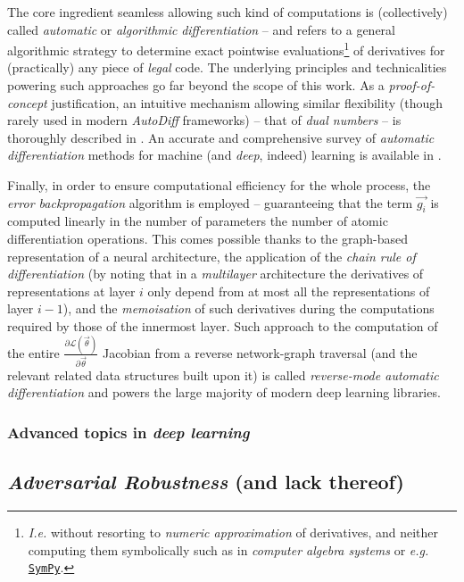 The core ingredient seamless allowing such kind of computations is (collectively) called \textit{automatic} or \textit{algorithmic} \textit{differentiation} -- and refers to a general algorithmic strategy to determine exact pointwise evaluations\footnote{\textit{I.e.} without resorting to \textit{numeric approximation} of derivatives, and neither computing them symbolically such as in \textit{computer algebra systems} or \textit{e.g.} \href{https://www.sympy.org/}{\texttt{SymPy}}.} of derivatives for (practically) any piece of \textit{legal} code. The underlying principles and technicalities powering such approaches go far beyond the scope of this work. As a \textit{proof-of-concept} justification, an intuitive mechanism allowing similar flexibility (though rarely used in modern \textit{AutoDiff} frameworks) -- that of \textit{dual numbers} -- is thoroughly described in \cite{Fischer1998DualNumbers}. An accurate and comprehensive survey of \textit{automatic differentiation} methods for machine (and \textit{deep}, indeed) learning is available in \cite{BaydinEtAl2018AutoDiff}.

Finally, in order to ensure computational efficiency for the whole process, the \textit{error backpropagation} algorithm is employed -- guaranteeing that the term $\vec{g_i}$ is computed linearly in the number of parameters \wrt the number of atomic differentiation operations. This comes possible thanks to the graph-based representation of a neural architecture, the application of the \textit{chain rule of differentiation} (by noting that in a \textit{multilayer} architecture the derivatives of representations at layer $i$ only depend from at most all the representations of layer $i-1$), and the \textit{memoisation} of such derivatives during the computations required by those of the innermost layer. Such approach to the computation of the entire $\frac{\partial\mathcal{L}(\vec{\theta})}{\partial\vec{\theta}}$ Jacobian from a reverse network-graph traversal (and the relevant related data structures built upon it) is called \textit{reverse-mode automatic differentiation} and powers the large majority of modern deep learning libraries.

\subsubsection{Advanced topics in \textit{deep learning}}

\subsection{\textit{Adversarial Robustness} (and lack thereof)}
